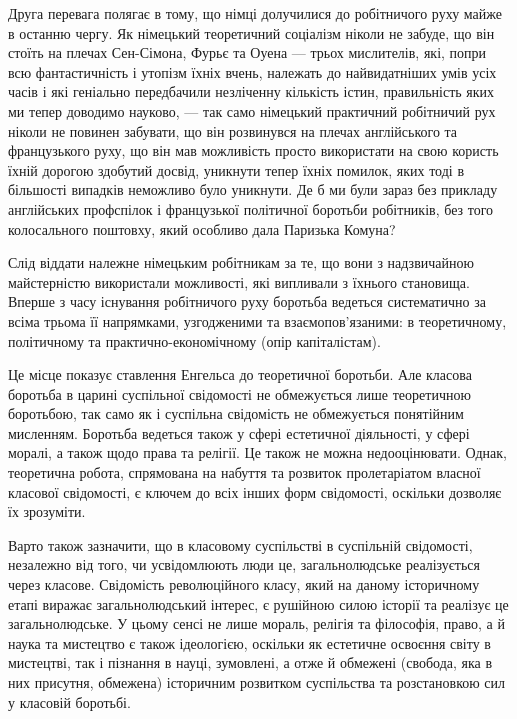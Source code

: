 \documentclass[12pt,a4paper,openany]{book}
\begin{document}
Друга перевага полягає в тому, що німці долучилися до робітничого руху майже в останню чергу. Як німецький теоретичний соціалізм ніколи не забуде, що він стоїть на плечах Сен-Сімона, Фурьє та Оуена — трьох мислителів, які, попри всю фантастичність і утопізм їхніх вчень, належать до найвидатніших умів усіх часів і які геніально передбачили незліченну кількість істин, правильність яких ми тепер доводимо науково, — так само німецький практичний робітничий рух ніколи не повинен забувати, що він розвинувся на плечах англійського та французького руху, що він мав можливість просто використати на свою користь їхній дорогою здобутий досвід, уникнути тепер їхніх помилок, яких тоді в більшості випадків неможливо було уникнути. Де б ми були зараз без прикладу англійських профспілок і французької політичної боротьби робітників, без того колосального поштовху, який особливо дала Паризька Комуна?

Слід віддати належне німецьким робітникам за те, що вони з надзвичайною майстерністю використали можливості, які випливали з їхнього становища. Вперше з часу існування робітничого руху боротьба ведеться систематично за всіма трьома її напрямками, узгодженими та взаємопов’язаними: в теоретичному, політичному та практично-економічному (опір капіталістам).

Це місце показує ставлення Енгельса до теоретичної боротьби. Але класова боротьба в царині суспільної свідомості не обмежується лише теоретичною боротьбою, так само як і суспільна свідомість не обмежується понятійним мисленням. Боротьба ведеться також у сфері естетичної діяльності, у сфері моралі, а також щодо права та релігії. Це також не можна недооцінювати. Однак, теоретична робота, спрямована на набуття та розвиток пролетаріатом власної класової свідомості, є ключем до всіх інших форм свідомості, оскільки дозволяє їх зрозуміти.

Варто також зазначити, що в класовому суспільстві в суспільній свідомості, незалежно від того, чи усвідомлюють люди це, загальнолюдське реалізується через класове. Свідомість революційного класу, який на даному історичному етапі виражає загальнолюдський інтерес, є рушійною силою історії та реалізує це загальнолюдське. У цьому сенсі не лише мораль, релігія та філософія, право, а й наука та мистецтво є також ідеологією, оскільки як естетичне освоєння світу в мистецтві, так і пізнання в науці, зумовлені, а отже й обмежені (свобода, яка в них присутня, обмежена) історичним розвитком суспільства та розстановкою сил у класовій боротьбі.
\end{document}
